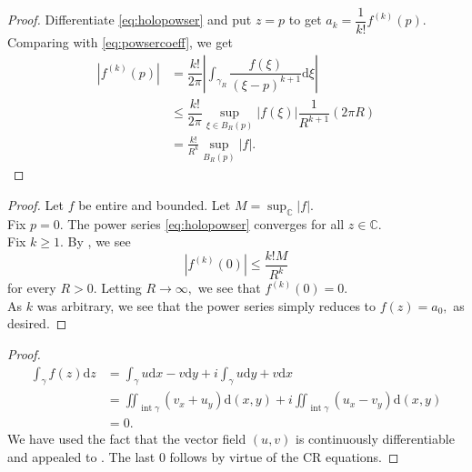 \cauchest*\label{thm:cauchest2}
\begin{flushright}\hyperref[thm:cauchest]{\upsym}\end{flushright}
\begin{proof}
	Differentiate \cref{eq:holopowser} and put $z = p$ to get $a_k = \dfrac{1}{k!}f^{(k)}(p).$\\
	Comparing with \cref{eq:powsercoeff}, we get
	\begin{align*} 
		\left|f^{(k)}(p)\right| &= \dfrac{k!}{2\pi}\left|\int_{\gamma_R}^{} \dfrac{f(\xi)}{(\xi - p)^{k+1}} \mathrm{d}\xi\right|\\
		&\le \dfrac{k!}{2\pi}\sup_{\xi \in B_R(p)}|f(\xi)|\dfrac{1}{R^{k+1}}(2\pi R)\\
		&=\frac{k!}{R^k}\sup_{B_R(p)}|f|.
	\end{align*}
\end{proof}


\boundedentire*\label{thm:boundedentire2}
\begin{flushright}\hyperref[thm:boundedentire]{\upsym}\end{flushright}
\begin{proof}
	Let $f$ be entire and bounded. Let $M = \displaystyle\sup_\mathbb{C}|f|.$\\
	Fix $p = 0.$ The power series \cref{eq:holopowser} converges for all $z \in \mathbb{C}.$\\
	Fix $k \ge 1.$ By , we see
	\begin{equation*} 
		|f^{(k)}(0)| \le \dfrac{k!M}{R^k}
	\end{equation*}
	for every $R > 0.$ Letting $R \to \infty,$ we see that $f^{(k)}(0) = 0.$\\
	As $k$ was arbitrary, we see that the power series simply reduces to $f(z) = a_0,$ as desired.
\end{proof}

\cauchyintegral*\label{thm:cauchyintegral2}
\begin{flushright}\hyperref[thm:cauchyintegral]{\upsym}\end{flushright}
\begin{proof}
	\begin{align*} 
		\int_{\gamma}^{} f(z) \mathrm{d}z &= \int_\gamma u\mathrm{d}x - v\mathrm{d}y + i\int_\gamma u\mathrm{d}y + v\mathrm{d}x\\
		&= \iint_{\operatorname{int}\gamma}(v_x + u_y)\mathrm{d}(x, y) + i\iint_{\operatorname{int}\gamma}(u_x - v_y)\mathrm{d}(x, y)\\
		&= 0.
	\end{align*}
	We have used the fact that the vector field $(u, v)$ is continuously differentiable and appealed to . The last $0$ follows by virtue of the CR equations.
\end{proof}


